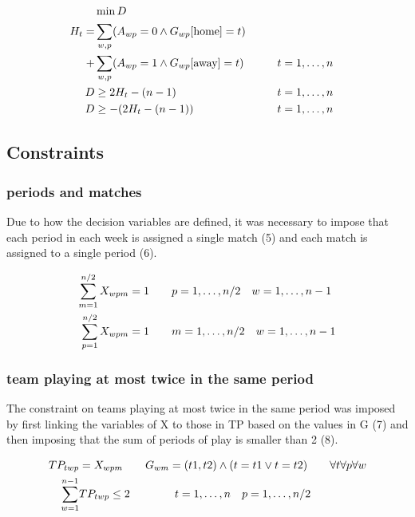 \documentclass{article}
\begin{document}
\begin{align}
    &\min  D \\
    H_t =& \sum_{w, p} (A_{wp} = 0 \land G_{wp}[\text{home}] = t) \notag \\
    +& \sum_{w, p} (A_{wp} = 1 \land G_{wp}[\text{away}] = t) \hspace{20px}  &&t =1, \dots, n\\
    D &\geq 2H_t - (n-1) && t = 1, \dots, n\\
    D & \geq -(2 H_t - (n-1)) && t = 1, \dots, n
\end{align}


\subsection{Constraints}
\subsubsection{periods and matches}
Due to how the decision variables are defined, it was necessary to impose that each period in each week is assigned a single match (5) and each match is assigned to a single period (6).

\begin{align}
    \sum_{m = 1}^{n/2} X_{wpm} &= 1 \hspace{20px} p =1, \dots, n/2 \hspace{10px} w = 1,\dots, n-1 \\
    \sum_{p = 1}^{n/2} X_{wpm} &= 1 \hspace{20px} m = 1, \dots, n/2 \hspace{10px} w = 1,\dots, n-1
\end{align}

\subsubsection{team playing at most twice in the same period}
The constraint on teams playing at most twice in the same period was imposed by first linking the variables of X to those in TP based on the values in G (7) and then imposing that the sum of periods of play is smaller than 2 (8). 

\begin{align}
    TP_{twp} &= X_{wpm} \hspace{20px} G_{wm} =(t1, t2) \land (t = t1 \lor t=t2) \hspace{20px} \forall t \forall p  \forall w\\
    \sum_{w=1}^{n-1} &TP_{twp} \leq 2 \hspace{40px} t=1, \dots, n \hspace{10px} p = 1, \dots, n/2
\end{align}
\end{document}
